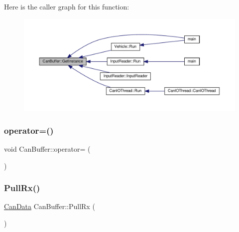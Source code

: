 Here is the caller graph for this function\+:
\nopagebreak
\begin{figure}[H]
\begin{center}
\leavevmode
\includegraphics[width=350pt]{classCanBuffer_add61873bc4e32e5b79ca665c1926f3b9_icgraph}
\end{center}
\end{figure}
\mbox{\label{classCanBuffer_aa2a1c35e5a3cf6106d78f986de53911d}} 
\subsubsection{\texorpdfstring{operator=()}{operator=()}}
{\footnotesize\ttfamily void Can\+Buffer\+::operator= (\begin{DoxyParamCaption}\item[{\hyperlink{classCanBuffer}{Can\+Buffer} const \&}]{ }\end{DoxyParamCaption})\hspace{0.3cm}{\ttfamily [delete]}}

\mbox{\label{classCanBuffer_a66691d3306e47774f768fd391fff1802}} 
\subsubsection{\texorpdfstring{Pull\+Rx()}{PullRx()}}
{\footnotesize\ttfamily \hyperlink{can__buffer_8h_a7a5dfa274d7d04c73e0b6b3e4dbbb87c}{Can\+Data} Can\+Buffer\+::\+Pull\+Rx (\begin{DoxyParamCaption}{ }\end{DoxyParamCaption})}

